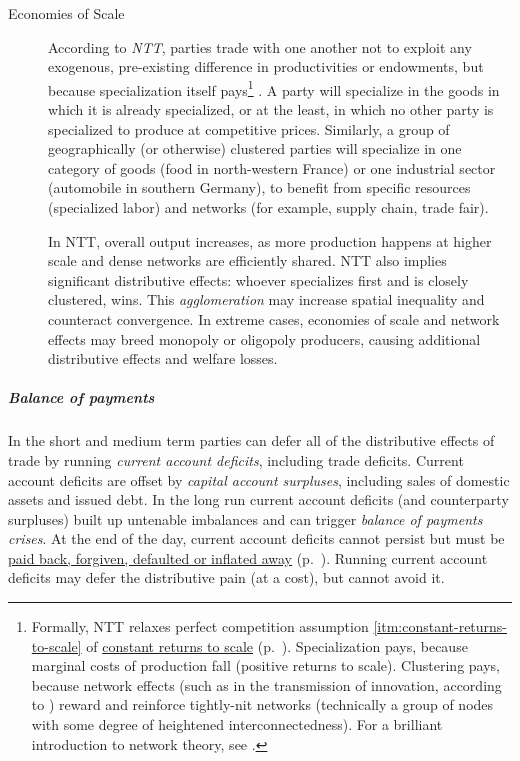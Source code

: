 \begin{description}
	\item[Economies of Scale] \label{itm:NTT} According to \emph{\gls{NTT}}, parties trade with one another not to exploit any exogenous, pre-existing difference in productivities or endowments, but because specialization itself pays\footnote{
		Formally, \gls{NTT} relaxes perfect competition assumption \ref{itm:constant-returns-to-scale} of \hyperref[itm:constant-returns-to-scale]{constant returns to scale} (p.~\pageref{itm:constant-returns-to-scale}). Specialization pays, because marginal costs of production fall (positive returns to scale). Clustering pays, because network effects (such as in the transmission of innovation, according to \citealt{Bass1969}) reward and reinforce tightly-nit networks (technically a group of nodes with some degree of heightened interconnectedness). For a brilliant introduction to network theory, see \cite{Kleinberg-2009-oz}.} 
	\citep{Krugman-1980-aa}. A party will specialize in the goods in which it is already specialized, or at the least, in which no other party is specialized to produce at competitive prices. Similarly, a group of geographically (or otherwise) clustered parties will specialize in one category of goods (food in north-western France) or one industrial sector (automobile in southern Germany), to benefit from specific resources (specialized labor) and networks (for example, supply chain, trade fair).

	In \gls{NTT}, overall output increases, as more production happens at higher scale and dense networks are efficiently shared. \gls{NTT} also implies significant distributive effects: whoever specializes first and is closely clustered, wins. This \emph{agglomeration} may increase spatial inequality and counteract convergence. %
	In extreme cases, economies of scale and network effects may breed monopoly or oligopoly producers, causing additional distributive effects and welfare losses.
\end{description}

\subparagraph{Balance of payments}
In the short and medium term parties can defer all of the distributive effects of trade by running \emph{current account deficits}, including trade deficits. Current account deficits are offset by \emph{capital account surpluses}, including sales of domestic assets and issued debt. In the long run current account deficits (and counterparty surpluses) built up untenable imbalances and can trigger \emph{balance of payments crises}. At the end of the day, current account deficits cannot persist but must be \hyperref[sec:imbalances]{paid back, forgiven, defaulted or inflated away} (p.~\pageref{sec:imbalances}). Running current account deficits may defer the distributive pain (at a cost), but cannot avoid it.

